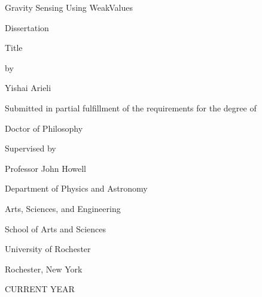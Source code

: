 \documentclass[\main/master.tex]{subfiles}
\begin{document}
\pagestyle{empty}
\begin{titlepage}
\doublespacing
\begin{center}
  {\titlefont Gravity Sensing Using WeakValues\par \vspace{10 mm}
   Dissertation \par \vspace{10 mm}
   Title}
   \vfill
   by\par
   \vfill
   Yishai Arieli\par
   \vspace{1.5in}
   Submitted in partial fulfillment of the requirements for the degree of\par
   \vfill
   Doctor of Philosophy\par
   \vfill
   Supervised by\par
   Professor John Howell\par
   \vspace{1.5in}
   Department of Physics and Astronomy\par
   Arts, Sciences, and Engineering\par
   School of Arts and Sciences \par
   \vfill
   University of Rochester \par
   Rochester, New York \par
   CURRENT YEAR
   \end{center}
  \end{titlepage}
\end{document}
